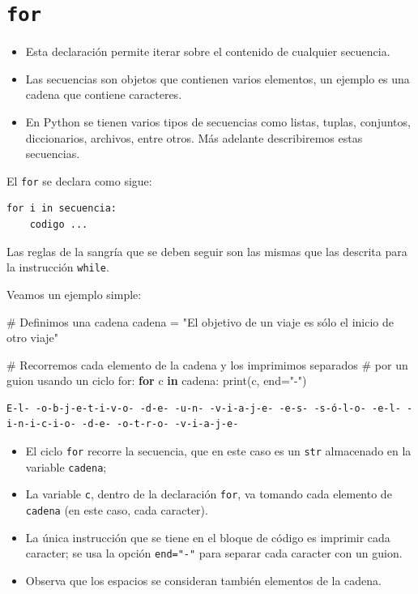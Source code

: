 \documentclass[
  spanish,
  letterpaper,
]{scrbook}
\newenvironment{Shaded}{\begin{snugshade}}{\end{snugshade}}
\newcommand{\BuiltInTok}[1]{\textcolor[rgb]{0.00,0.23,0.31}{#1}}
\newcommand{\CommentTok}[1]{\textcolor[rgb]{0.37,0.37,0.37}{#1}}
\newcommand{\ControlFlowTok}[1]{\textcolor[rgb]{0.00,0.23,0.31}{\textbf{#1}}}
\newcommand{\KeywordTok}[1]{\textcolor[rgb]{0.00,0.23,0.31}{\textbf{#1}}}
\newcommand{\NormalTok}[1]{\textcolor[rgb]{0.00,0.23,0.31}{#1}}
\newcommand{\OperatorTok}[1]{\textcolor[rgb]{0.37,0.37,0.37}{#1}}
\newcommand{\StringTok}[1]{\textcolor[rgb]{0.13,0.47,0.30}{#1}}
\providecommand{\tightlist}{%
  \setlength{\itemsep}{0pt}\setlength{\parskip}{0pt}}
\theoremstyle{definition}
\theoremstyle{remark}
\begin{document}
\section{\texorpdfstring{\texttt{for}}{for}}\label{for}

\begin{itemize}
\tightlist
\item
  Esta declaración permite iterar sobre el contenido de cualquier
  secuencia.
\item
  Las secuencias son objetos que contienen varios elementos, un ejemplo
  es una cadena que contiene caracteres.
\item
  En Python se tienen varios tipos de secuencias como listas, tuplas,
  conjuntos, diccionarios, archivos, entre otros. Más adelante
  describiremos estas secuencias.
\end{itemize}

El \texttt{for} se declara como sigue:

\begin{verbatim}
for i in secuencia:
    codigo ...
\end{verbatim}

Las reglas de la sangría que se deben seguir son las mismas que las
descrita para la instrucción \texttt{while}.

Veamos un ejemplo simple:

\begin{Shaded}
\begin{Highlighting}[]
\CommentTok{\# Definimos una cadena}
\NormalTok{cadena }\OperatorTok{=} \StringTok{"El objetivo de un viaje es sólo el inicio de otro viaje"}

\CommentTok{\# Recorremos cada elemento de la \textquotesingle{}cadena\textquotesingle{} y los imprimimos separados }
\CommentTok{\# por un guion usando un ciclo \textquotesingle{}for\textquotesingle{}:}
\ControlFlowTok{for}\NormalTok{ c }\KeywordTok{in}\NormalTok{ cadena:}
    \BuiltInTok{print}\NormalTok{(c, end}\OperatorTok{=}\StringTok{"{-}"}\NormalTok{)}
\end{Highlighting}
\end{Shaded}

\begin{verbatim}
E-l- -o-b-j-e-t-i-v-o- -d-e- -u-n- -v-i-a-j-e- -e-s- -s-ó-l-o- -e-l- -i-n-i-c-i-o- -d-e- -o-t-r-o- -v-i-a-j-e-
\end{verbatim}

\begin{itemize}
\tightlist
\item
  El ciclo \texttt{for} recorre la secuencia, que en este caso es un
  \texttt{str} almacenado en la variable \texttt{cadena};
\item
  La variable \texttt{c}, dentro de la declaración \texttt{for}, va
  tomando cada elemento de \texttt{cadena} (en este caso, cada
  caracter).
\item
  La única instrucción que se tiene en el bloque de código es imprimir
  cada caracter; se usa la opción \texttt{end="-"} para separar cada
  caracter con un guion.
\item
  Observa que los espacios se consideran también elementos de la cadena.
\end{itemize}
\end{document}
